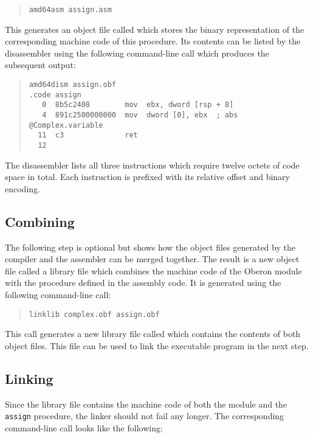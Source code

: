 \begin{quote}\begin{verbatim}
amd64asm assign.asm
\end{verbatim}\end{quote}

This generates an object file called  which stores the binary representation of the corresponding machine code of this procedure.
Its contents can be listed by the disassembler using the following command-line call which produces the subsequent output:

\begin{quote}\begin{verbatim}
amd64dism assign.obf
.code assign
   0  8b5c2408        mov  ebx, dword [rsp + 8]
   4  891c2500000000  mov  dword [0], ebx  ; abs @Complex.variable
  11  c3              ret
  12
\end{verbatim}\end{quote}

The disassembler lists all three instructions which require twelve octets of code space in total.
Each instruction is prefixed with its relative offset and binary encoding.

\subsection{Combining}

The following step is optional but shows how the object files generated by the compiler and the assembler can be merged together.
The result is a new object file called a library file which combines the machine code of the Oberon module with the procedure defined in the assembly code.
It is generated using the following command-line call:

\begin{quote}\begin{verbatim}
linklib complex.obf assign.obf
\end{verbatim}\end{quote}

This call generates a new library file called  which contains the contents of both object files.
This file can be used to link the executable program in the next step.

\subsection{Linking}

Since the library file contains the machine code of both the module and the \texttt{assign} procedure, the linker should not fail any longer.
The corresponding command-line call looks like the following:


